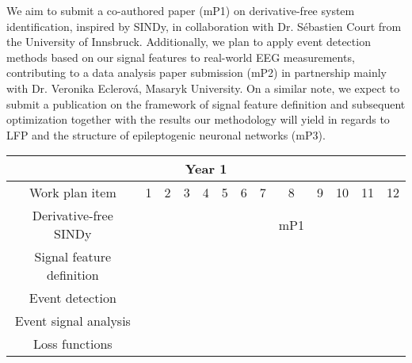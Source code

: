 \documentclass[a4paper,11pt]{scrartcl}
\begin{document}
We aim to submit a co-authored paper (mP1) on derivative-free system identification, inspired by SINDy, in collaboration with Dr. Sébastien Court from the University of Innsbruck. Additionally, we plan to apply event detection methods based on our signal features to real-world EEG measurements, contributing to a data analysis paper submission (mP2) in partnership mainly with Dr. Veronika Eclerová, Masaryk University. On a similar note, we expect to submit a publication on the framework of signal feature definition and subsequent optimization together with the results our methodology will yield in regards to LFP and the structure of epileptogenic neuronal networks (mP3).


\setlength\extrarowheight{3pt}
\begin{table}[h!]
    \centering
     \addtolength{\tabcolsep}{-3pt}
     \fontsize{10pt}{11pt}\selectfont
    \begin{tabular}{|c|c|c|c|c|c|c|c|c|c|c|c|c|}
    \hline
    \multicolumn{13}{|c|}{\cellcolor{gray!50} Year 1} \\
        \hline
        Work plan item & 1 & 2 & 3 & 4 & 5 & 6 & 7 & 8 & 9 & 10 & 11 & 12 \\
        \hline
        Derivative-free SINDy & \cellcolor{orange!25} & \cellcolor{orange!25} & \cellcolor{orange!25} & \cellcolor{orange!25} & \cellcolor{orange!25} & \cellcolor{orange!25} & \cellcolor{orange!25} & \cellcolor{orange!25} mP1 & & & & \\
        \hline
        Signal feature definition & & \cellcolor{blue!25} & \cellcolor{blue!25} & \cellcolor{blue!25} & & & & \cellcolor{blue!25} & \cellcolor{blue!25} & \cellcolor{blue!25} & \cellcolor{blue!25} & \\
        \hline
        Event detection & & & & \cellcolor{blue!25} & \cellcolor{blue!25} & \cellcolor{blue!25} & & & & \cellcolor{blue!25} & \cellcolor{blue!25} & \cellcolor{blue!25} \\
        \hline
        Event signal analysis & & & & & & \cellcolor{blue!25} & \cellcolor{blue!25} & \cellcolor{blue!25} & & & & \cellcolor{blue!25} \\
        \hline
        Loss functions & & & & & \cellcolor{purple!25} & \cellcolor{purple!25} & & & & & \cellcolor{purple!25} & \cellcolor{purple!25} \\
        

\end{tabular}
\end{table}
\end{document}
